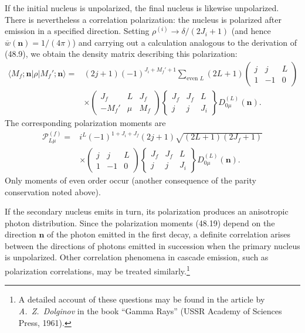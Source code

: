 If the initial nucleus is unpolarized, the final nucleus is likewise unpolarized. There is nevertheless a correlation polarization: the nucleus is polarized after emission in a specified direction. Setting $\rho^{(i)}\to\delta/(2J_i+1)$ (and hence $\overline w(\mathbf n)=1/(4\pi)$) and carrying out a calculation analogous to the derivation of (48.9), we obtain the density matrix describing this polarization:
\begin{equation}
\begin{split}
\langle M_f;\mathbf n|\rho|M_f';\mathbf n\rangle
={}&(2j+1)(-1)^{J_i+M_f'+1}
\sum_{\text{even }L}(2L+1)
\begin{pmatrix}j&j&L\\1&-1&0\end{pmatrix}\\
&\times\begin{pmatrix}J_f&L&J_f\\-M_f'&\mu&M_f\end{pmatrix}
\left\{\begin{matrix}J_f&J_f&L\\j&j&J_i\end{matrix}\right\}
D_{0\mu}^{(L)}(\mathbf n).
\end{split}
\tag{48.18}
\end{equation}
The corresponding polarization moments are
\begin{equation}
\begin{split}
\mathcal P_{L\mu}^{(f)}={}&i^L(-1)^{1+J_i+J_f}(2j+1)
\sqrt{(2L+1)(2J_f+1)}\\
&\times\begin{pmatrix}j&j&L\\1&-1&0\end{pmatrix}
\left\{\begin{matrix}J_f&J_f&L\\j&j&J_i\end{matrix}\right\}
D_{0\mu}^{(L)}(\mathbf n).
\end{split}
\tag{48.19}
\end{equation}
Only moments of even order occur (another consequence of the parity conservation noted above).

If the secondary nucleus emits in turn, its polarization produces an anisotropic photon distribution. Since the polarization moments (48.19) depend on the direction $\mathbf n$ of the photon emitted in the first decay, a definite correlation arises between the directions of photons emitted in succession when the primary nucleus is unpolarized. Other correlation phenomena in cascade emission, such as polarization correlations, may be treated similarly.\footnote{A detailed account of these questions may be found in the article by \emph{A.~Z.~Dolginov} in the book ``Gamma Rays'' (USSR Academy of Sciences Press, 1961).}

